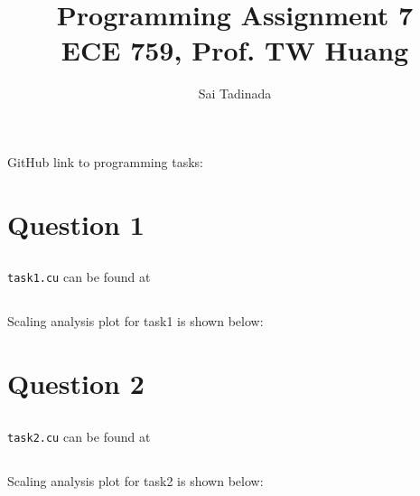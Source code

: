 \documentclass[12pt]{article}
\title{Programming Assignment 7 \\ \small{ECE 759, Prof. TW Huang}}
\author{Sai Tadinada}
\date{}
\begin{document}
\maketitle

GitHub link to programming tasks: \\ \url{} %

\section{Question 1}

\subsection{}
\texttt{task1.cu} can be found at \url{} %

\subsection{}
Scaling analysis plot for task1 is shown below:

\subsection{}
\subsection{} %
\subsection{} %
\subsection{} %

\section{Question 2}

\subsection{}
\texttt{task2.cu} can be found at \url{} %

\subsection{}
Scaling analysis plot for task2 is shown below:
\end{document}
